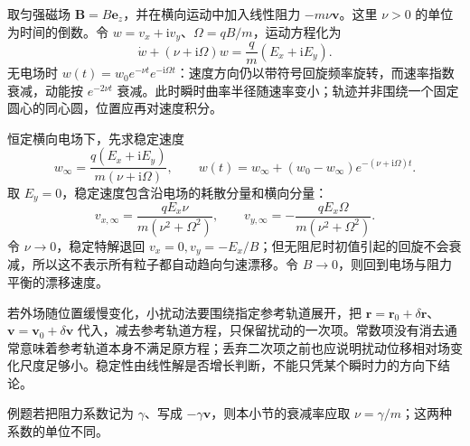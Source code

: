 取匀强磁场 $\boldsymbol B=B\boldsymbol e_z$，并在横向运动中加入线性阻力 $-m\nu\boldsymbol v$。这里 $\nu>0$ 的单位为时间的倒数。令 $w=v_x+\mathrm i v_y$、$\Omega=qB/m$，运动方程化为
\[
 \dot w+(\nu+\mathrm i\Omega)w=\frac q m(E_x+\mathrm iE_y).
\]
无电场时 $w(t)=w_0e^{-\nu t}e^{-\mathrm i\Omega t}$：速度方向仍以带符号回旋频率旋转，而速率指数衰减，动能按 $e^{-2\nu t}$ 衰减。此时瞬时曲率半径随速率变小；轨迹并非围绕一个固定圆心的同心圆，位置应再对速度积分。

恒定横向电场下，先求稳定速度
\[
 w_\infty=\frac{q(E_x+\mathrm iE_y)}{m(\nu+\mathrm i\Omega)},\qquad
 w(t)=w_\infty+(w_0-w_\infty)e^{-(\nu+\mathrm i\Omega)t}.
\]
取 $E_y=0$，稳定速度包含沿电场的耗散分量和横向分量：
\[
 v_{x,\infty}=\frac{qE_x\nu}{m(\nu^2+\Omega^2)},\qquad
 v_{y,\infty}=-\frac{qE_x\Omega}{m(\nu^2+\Omega^2)}.
\]
令 $\nu\to0$，稳定特解退回 $v_x=0,v_y=-E_x/B$；但无阻尼时初值引起的回旋不会衰减，所以这不表示所有粒子都自动趋向匀速漂移。令 $B\to0$，则回到电场与阻力平衡的漂移速度。

若外场随位置缓慢变化，小扰动法要围绕指定参考轨道展开，把 $\boldsymbol r=\boldsymbol r_0+\delta\boldsymbol r$、$\boldsymbol v=\boldsymbol v_0+\delta\boldsymbol v$ 代入，减去参考轨道方程，只保留扰动的一次项。常数项没有消去通常意味着参考轨道本身不满足原方程；丢弃二次项之前也应说明扰动位移相对场变化尺度足够小。稳定性由线性解是否增长判断，不能只凭某个瞬时力的方向下结论。

例题若把阻力系数记为 $\gamma$、写成 $-\gamma\boldsymbol v$，则本小节的衰减率应取 $\nu=\gamma/m$；这两种系数的单位不同。
